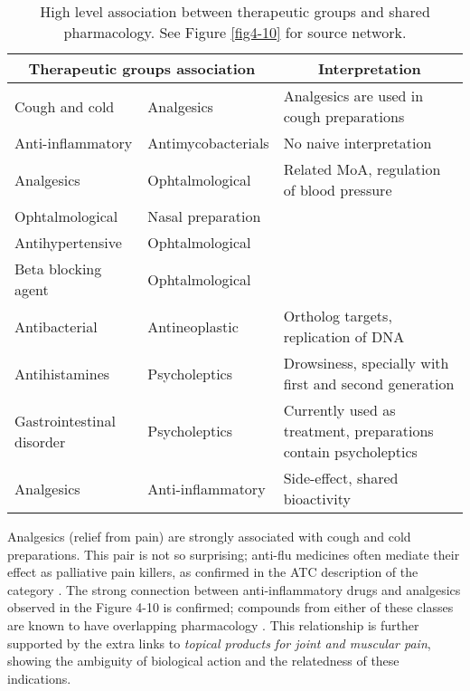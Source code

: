 \begin{table}[htbp]
\scriptsize
\begin{tabular}{|l|l|p{5cm}|}
\hline
\multicolumn{2}{|c|}{\textbf{Therapeutic groups association}} & \multicolumn{1}{c|}{\textbf{Interpretation}} \\ \hline
Cough and cold & Analgesics & Analgesics are used in cough preparations \citep{atcr05} \\ \hline
Anti-inflammatory & Antimycobacterials & No naive interpretation \\ \hline
Analgesics & Ophtalmological & \multicolumn{ 1}{l|}{Related MoA, regulation of blood pressure} \\ \cline{ 1- 2}
Ophtalmological & Nasal preparation & \multicolumn{ 1}{l|}{} \\ \cline{ 1- 2}
Antihypertensive & Ophtalmological & \multicolumn{ 1}{l|}{} \\ \cline{ 1- 2}
Beta blocking agent & Ophtalmological & \multicolumn{ 1}{l|}{} \\ \hline
Antibacterial & Antineoplastic & Ortholog targets, replication of DNA \\ \hline
Antihistamines & Psycholeptics & Drowsiness, specially with first and second generation \citep{gengo1987antihistamines} \\ \hline
Gastrointestinal disorder & Psycholeptics & Currently used as treatment, preparations contain psycholeptics \citep{atca03} \\ \hline
Analgesics & Anti-inflammatory & Side-effect, shared bioactivity \citep{hunskaar1987formalin} \\ \hline
\end{tabular}
\caption{High level association between therapeutic groups and shared pharmacology. See Figure \ref{fig4-10} for source network.}
\label{higlevelhypo}
\end{table}

Analgesics (relief from pain) are strongly associated with cough and cold preparations. This pair is not so surprising; anti-flu medicines often mediate their effect as palliative pain killers, as confirmed in the ATC description of the category \citep{atcr05}. The strong connection between anti-inflammatory drugs and analgesics observed in the Figure 4-10 is confirmed; compounds from either of these classes are known to have overlapping pharmacology \citep{hunskaar1987formalin}. This relationship is further supported by the extra links to \emph{topical products for joint and muscular pain}, showing the ambiguity of biological action and the relatedness of these indications.

